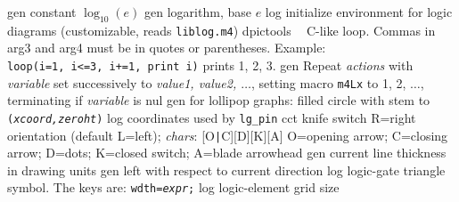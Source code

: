 %
  {gen}%
  {constant $\log_{10}(e)$}%
%
  {gen}%
  {logarithm, base $e$}%
%
  {log}%
  {initialize environment for logic diagrams
    (customizable, reads {\tt liblog.m4})}%
%
  {dpictools}%
  {$\;\;$ C-like loop.  Commas in arg3 and arg4 must
    be in quotes or parentheses. Example:\\
    {\tt loop(i=1, i<=3, i+=1, print i)} prints 1, 2, 3.}%
%
  {gen}%
  {Repeat {\sl actions} with {\sl variable} set successively to
   {\sl value1, value2, $\ldots$}, setting macro {\tt m4Lx} to 1, 2,
   $\ldots$, terminating if {\sl variable} is nul}%
 {gen}%
  {for lollipop graphs: filled circle with stem to
    {\tt ({\sl xcoord,zeroht})}}%
%
  {log}%
  {coordinates used by {\tt lg\_pin}}%
%
  {cct}%
  {knife switch R=right orientation (default L=left);
    {\sl chars}: [O{\tt|}C][D][K][A] O=opening arrow; C=closing arrow;
    D=dots; K=closed switch; A=blade arrowhead }%
%
  {gen}%
  {current line thickness in drawing units}%
%
  {gen}%
  {left with respect to current direction}%
%
  {log}%
  {logic-gate triangle symbol. The keys are:
    {\tt wdth={\sl expr};}}%
%
  {log}%
  {logic-element grid size}%

%

